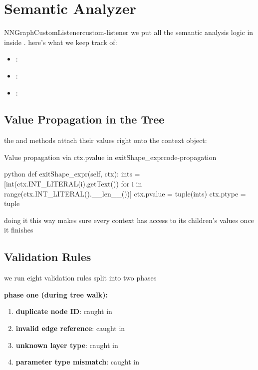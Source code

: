 \documentclass{nngraph-en}
\begin{document}
\section{Semantic Analyzer}

\begin{dfnbox}{NNGraphCustomListener}{custom-listener}
we put all the semantic analysis logic in  inside . 
here's what we keep track of:
\begin{itemize}[noitemsep]
    \item {}: 
    \item {}: 
    \item {}: 
\end{itemize}
\end{dfnbox}

\subsection{Value Propagation in the Tree}

the  and  methods attach their values right onto the context object:

\begin{codebox}{Value propagation via ctx.pvalue in exitShape\_expr}{code-propagation}
\begin{amzcode}{python}
def exitShape_expr(self, ctx):
    ints = [int(ctx.INT_LITERAL(i).getText())
            for i in range(ctx.INT_LITERAL().__len__())]
    ctx.pvalue = tuple(ints)
    ctx.ptype  = tuple
\end{amzcode}
\end{codebox}

doing it this way makes sure every context has access to its children's values once it finishes

\subsection{Validation Rules}

we run eight validation rules split into two phases

\textbf{phase one (during tree walk):}
\begin{enumerate}
    \item \textbf{duplicate node ID}: caught in 
    \item \textbf{invalid edge reference}: caught in 
    \item \textbf{unknown layer type}: caught in 
    \item \textbf{parameter type mismatch}: caught in 
\end{enumerate}
\end{document}
